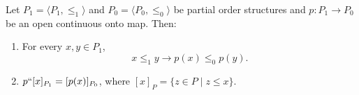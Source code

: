 Let $P_1 = \langle P_1, \leq_1 \rangle$ and $P_0 = \langle P_0, \leq_0 \rangle$ be partial order structures and $p: P_1 \to P_0$ be an open continuous onto map. Then:

\begin{enumerate}
\item For every $x, y \in P_1$,
$$x \leq_1 y \rightarrow p(x) \leq_0 p(y).$$

\item $p``[x]_{P_1} = [p(x)]_{P_0}$, where $[x]_{P} = \{z \in P \mid z \leq x\}$.
\end{enumerate}
